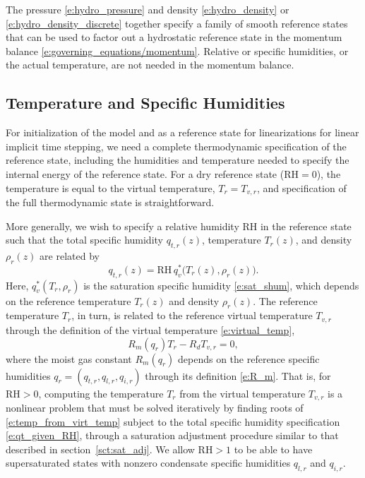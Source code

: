 \documentclass{report}
\begin{document}
The pressure \eqref{e:hydro_pressure} and density \eqref{e:hydro_density} or \eqref{e:hydro_density_discrete} together specify a family of smooth reference states that can be used to factor out a hydrostatic reference state in the momentum balance \eqref{e:governing_equations/momentum}. Relative or specific humidities, or the actual temperature, are not needed in the momentum balance.

\subsection{Temperature and Specific Humidities}

For initialization of the model and as a reference state for linearizations for linear implicit time stepping, we need a complete thermodynamic specification of the reference state, including the humidities and temperature needed to specify the internal energy of the reference state. For a dry reference state ($\mathrm{RH}=0$), the temperature is equal to the virtual temperature, $T_r  = T_{v,r}$, and specification of the full thermodynamic state is straightforward. 

More generally, we wish to specify a relative humidity $\mathrm{RH}$ in the reference state such that the total specific humidity $q_{t, r}(z)$, temperature $T_{r}(z)$, and density $\rho_r(z)$ are related by
\begin{equation}\label{e:qt_given_RH}
    q_{t,r}(z) = \mathrm{RH} \, q_v^*\bigl( T_{r}(z), \rho_r(z) \bigr).
\end{equation}
Here, $q_v^*(T_r, \rho_r)$ is the saturation specific humidity \eqref{e:sat_shum}, which depends on the reference temperature $T_r(z)$ and density $\rho_r(z)$. The reference temperature $T_r$, in turn, is related to the reference virtual temperature $T_{v, r}$ through the definition of the virtual temperature \eqref{e:virtual_temp},
\begin{equation}\label{e:temp_from_virt_temp}
R_m(q_r) T_r - R_d T_{v, r} = 0,
\end{equation}
where the moist gas constant $R_m(q_r)$ depends on the reference specific humidities $q_r=(q_{t,r}, q_{l, r}, q_{i, r})$ through its definition \eqref{e:R_m}. That is, for $\mathrm{RH}>0$, computing the temperature $T_r$ from the virtual temperature $T_{v, r}$ is a nonlinear problem that must be solved iteratively by finding roots of \eqref{e:temp_from_virt_temp} subject to the total specific humidity specification \eqref{e:qt_given_RH}, through a saturation adjustment procedure similar to that described in section~\ref{sct:sat_adj}. We allow $\mathrm{RH} > 1$ to be able to have supersaturated states with nonzero condensate specific humidities $q_{l, r}$ and $q_{i, r}$. 
\end{document}
